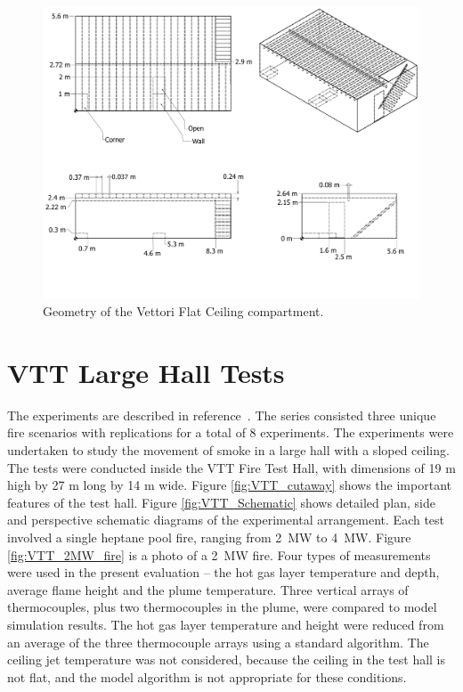 \begin{figure}[\figoptions{b}]
\begin{center}
\includegraphics[width=6.5in]{FIGURES/Vettori_Flat/Vettori_Flat_Ceiling}
\end{center}
\caption[Geometry of the Vettori Flat Ceiling compartment]{Geometry of the Vettori Flat Ceiling compartment.}
\label{Vettori_Drawing}
\end{figure}

\section{VTT Large Hall Tests}

The experiments are described in reference~\cite{Hostikka:2001}. The series consisted three unique fire scenarios with replications for a total of 8 experiments. The experiments were undertaken to study the movement of smoke in a large hall with a sloped ceiling. The tests were conducted inside the VTT Fire Test Hall, with dimensions of 19 m high by 27 m long by 14 m wide. Figure \ref{fig:VTT_cutaway} shows the important features of the test hall. Figure \ref{fig:VTT_Schematic} shows detailed plan, side and perspective schematic diagrams of the experimental arrangement. Each test involved a single heptane pool fire, ranging from 2~MW to 4~MW. Figure \ref{fig:VTT_2MW_fire} is a photo of a 2~MW fire. Four types of measurements were used in the present evaluation -- the hot gas layer temperature and depth, average flame height and the plume temperature. Three vertical arrays of thermocouples, plus two thermocouples in the plume, were compared to model simulation results. The hot gas layer temperature and height were reduced from an average of the three thermocouple arrays using a standard algorithm. The ceiling jet temperature was not considered, because the ceiling in the test hall is not flat, and the model algorithm is not appropriate for these conditions.

